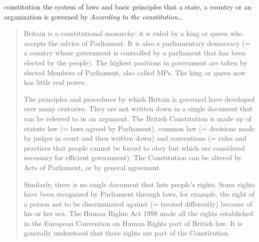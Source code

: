 \begin{DefWord}{constitution}
    the system of laws and basic principles that a state, a country or an organization is governed by
    \textit{According to the constitution…}

    \begin{quotation}
        Britain is a constitutional monarchy: it is ruled by a king or queen who accepts the advice of Parliament. It is also a parliamentary democracy (= a country whose government is controlled by a parliament that has been elected by the people). The highest positions in government are taken by elected Members of Parliament, also called MPs. The king or queen now has little real power.

        The principles and procedures by which Britain is governed have developed over many centuries. They are not written down in a single document that can be referred to in an argument. The British Constitution is made up of statute law (= laws agreed by Parliament), common law (= decisions made by judges in court and then written down) and conventions (= rules and practices that people cannot be forced to obey but which are considered necessary for efficient government). The Constitution can be altered by Acts of Parliament, or by general agreement.

        Similarly, there is no single document that lists people's rights. Some rights have been recognized by Parliament through laws, for example, the right of a person not to be discriminated against (= treated differently) because of his or her sex. The Human Rights Act 1998 made all the rights established in the European Convention on Human Rights part of British law. It is generally understood that these rights are part of the Constitution.
    \end{quotation}


\end{DefWord}
